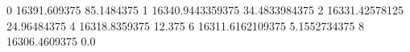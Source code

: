 0 16391.609375 85.1484375
1 16340.9443359375 34.4833984375
2 16331.42578125 24.96484375
4 16318.8359375 12.375
6 16311.6162109375 5.1552734375
8 16306.4609375 0.0

